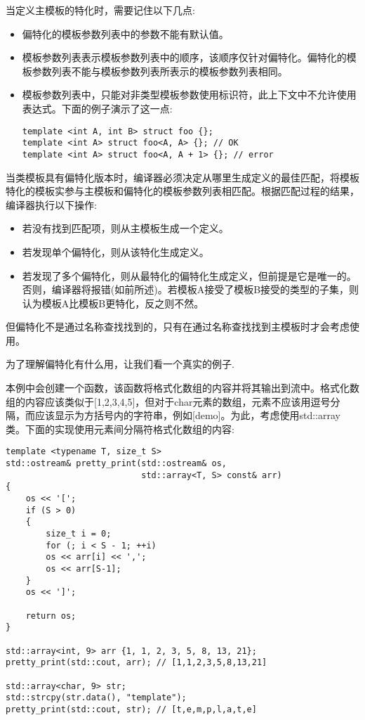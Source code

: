 当定义主模板的特化时，需要记住以下几点:

\begin{itemize}
\item 
偏特化的模板参数列表中的参数不能有默认值。

\item 
模板参数列表表示模板参数列表中的顺序，该顺序仅针对偏特化。偏特化的模板参数列表不能与模板参数列表所表示的模板参数列表相同。

\item 
模板参数列表中，只能对非类型模板参数使用标识符，此上下文中不允许使用表达式。下面的例子演示了这一点:
\begin{lstlisting}[style=styleCXX]
template <int A, int B> struct foo {};
template <int A> struct foo<A, A> {}; // OK
template <int A> struct foo<A, A + 1> {}; // error
\end{lstlisting}
\end{itemize}

当类模板具有偏特化版本时，编译器必须决定从哪里生成定义的最佳匹配，将模板特化的模板实参与主模板和偏特化的模板参数列表相匹配。根据匹配过程的结果，编译器执行以下操作:

\begin{itemize}
\item 
若没有找到匹配项，则从主模板生成一个定义。

\item 
若发现单个偏特化，则从该特化生成定义。

\item 
若发现了多个偏特化，则从最特化的偏特化生成定义，但前提是它是唯一的。否则，编译器将报错(如前所述)。若模板A接受了模板B接受的类型的子集，则认为模板A比模板B更特化，反之则不然。
\end{itemize}

但偏特化不是通过名称查找找到的，只有在通过名称查找找到主模板时才会考虑使用。

为了理解偏特化有什么用，让我们看一个真实的例子.

本例中会创建一个函数，该函数将格式化数组的内容并将其输出到流中。格式化数组的内容应该类似于[1,2,3,4,5]，但对于char元素的数组，元素不应该用逗号分隔，而应该显示为方括号内的字符串，例如[demo]。为此，考虑使用std::array类。下面的实现使用元素间分隔符格式化数组的内容:

\begin{lstlisting}[style=styleCXX]
template <typename T, size_t S>
std::ostream& pretty_print(std::ostream& os,
                           std::array<T, S> const& arr)
{
	os << '[';
	if (S > 0)
	{
		size_t i = 0;
		for (; i < S - 1; ++i)
		os << arr[i] << ',';
		os << arr[S-1];
	}
	os << ']';
	
	return os;
}

std::array<int, 9> arr {1, 1, 2, 3, 5, 8, 13, 21};
pretty_print(std::cout, arr); // [1,1,2,3,5,8,13,21]

std::array<char, 9> str;
std::strcpy(str.data(), "template");
pretty_print(std::cout, str); // [t,e,m,p,l,a,t,e]
\end{lstlisting}

